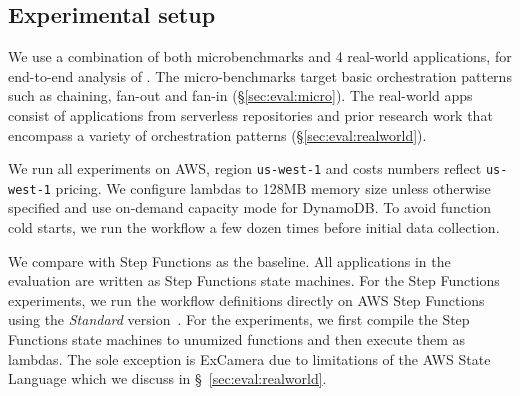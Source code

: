 


\subsection{Experimental setup}

We use a combination of both microbenchmarks and 4 real-world applications,
for end-to-end analysis of \name{}. The micro-benchmarks target basic
orchestration patterns such as chaining, fan-out and fan-in
(\S\ref{sec:eval:micro}). The real-world apps consist of applications from
serverless repositories and prior research work  that encompass a variety of
orchestration patterns (\S\ref{sec:eval:realworld}).

We run all experiments on AWS, region \texttt{us-west-1} and costs numbers
reflect \texttt{us-west-1} pricing. We configure lambdas to 128MB memory size
unless otherwise specified and use on-demand capacity mode for DynamoDB. To
avoid function cold starts, we run the workflow a few dozen times before
initial data collection.


We compare with Step Functions as the baseline. All applications in the
evaluation are written as Step Functions state machines. For the Step
Functions experiments, we run the workflow definitions directly on AWS Step
Functions using the \emph{Standard}
version~\cite{aws-step-functions-standard-vs-express}. For the \name{}
experiments, we first compile the Step Functions state machines to unumized
functions and then execute them as lambdas. The sole exception is ExCamera due
to limitations of the AWS State Language which we discuss in
\S~\ref{sec:eval:realworld}.

